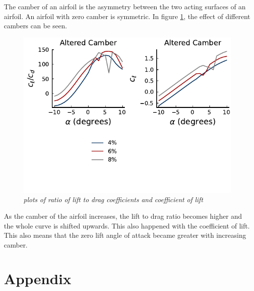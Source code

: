 \documentclass{journal}
\begin{document}
	The camber of an airfoil is the asymmetry between the two acting surfaces of an airfoil. An airfoil with zero camber is symmetric. In figure \ref{fig:altered-camber}, the effect of different cambers can be seen.
	
	\begin{figure}
		\centering
		\includegraphics{../graphics/altered-camber.pdf}
		\caption{\emph{plots of ratio of lift to drag coefficients and coefficient of lift}}
		\label{fig:altered-camber}
	\end{figure}
	
	As the camber of the airfoil increases, the lift to drag ratio becomes higher and the whole curve is shifted upwards. This also happened with the coefficient of lift. This also means that the zero lift angle of attack became greater with increasing camber. 
	
	
	\section*{Appendix}
	
\end{document}
